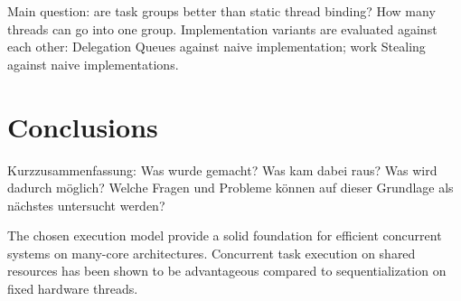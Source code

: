 \documentclass[journal]{IEEEtran}
\begin{document}
Main question: are task groups better than static thread binding? How
many threads can go into one group. Implementation variants are
evaluated against each other: Delegation Queues against naive
implementation; work Stealing against naive implementations.
 

\section{Conclusions}
\begin{itshape}
  Kurzzusammenfassung: Was wurde gemacht? Was kam dabei raus? Was wird
  dadurch möglich? Welche Fragen und Probleme können auf dieser
  Grundlage als nächstes untersucht werden?
\end{itshape}

The chosen execution model provide a solid foundation for efficient
concurrent systems on many-core architectures. Concurrent task
execution on shared resources has been shown to be advantageous
compared to sequentialization on fixed hardware threads.





%
\end{document}
